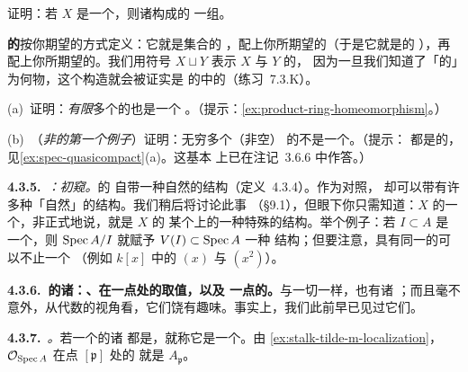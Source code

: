 \begin{exercise}[容易的练习]\label{ex:affine-opens-base}
证明：若 $X$ 是一个\trScheme，则诸\trAffine\trOpenSet{}构成\trZariskiTopology{}的
一组\trBase。
\end{exercise}

\begin{exercise}[容易的练习]\label{ex:disjoint-union-schemes}
\textbf{\trScheme{}的\trDisjointUnion}按你期望的方式定义：它就是集合的%
\trDisjointUnion，配上你所期望的\trTopology（于是它就是\trTopologicalSpace{}的%
\trDisjointUnion），再配上你所期望的\trSheaf。我们用符号 $X\sqcup Y$ 表示 $X$ 与
$Y$ 的\trDisjointUnion，
因为一旦我们知道了「\trScheme{}的\trMorphism」为何物，这个构造就会被证实是\trScheme{}
的\trCategory{}中的\trCoproduct（\mbox{练习~7.3.K}）。

(a)~证明：\emph{有限}多个\trAffineScheme{}的\trDisjointUnion{}也是一个%
\trAffineScheme。（提示：\cref{ex:product-ring-homeomorphism}。）

(b)~（\emph{非\trAffineScheme{}的第一个例子}）证明：无穷多个（非空）%
\trAffineScheme{}的\trDisjointUnion{}不是一个\trAffineScheme。（提示：%
\trAffineScheme{}都是\trQuasicompact{}的，见\cref{ex:spec-quasicompact}(a)。这基本
上已在注记~3.6.6 中作答。）
\end{exercise}

\textbf{4.3.5.}\ \emph{\trhRemark{}：初窥\trClosedSubscheme{}。}\quad \trScheme{}的%
\trOpenSubset{}自带一种自然的\trScheme{}结构（定义~4.3.4）。作为对照，%
\trClosedSubset{}却可以带有许多种「自然」的\trScheme{}结构。我们稍后将讨论此事
（\S9.1），但眼下你只需知道：$X$ 的一个\trClosedSubscheme，非正式地说，就是 $X$ 的
某个\trClosedSubset{}上的一种特殊的\trScheme{}结构。举个例子：若 $I\subset A$ 是
一个\trIdeal，则 $\operatorname{Spec} A/I$ 就赋予\trClosedSubset{} $V(I)\subset\operatorname{Spec} A$ 一种%
\trScheme{}结构；但要注意，具有同一\trVanishingSet{}的\trIdeal{}可以不止一个
（例如 $k[x]$ 中的 $(x)$ 与 $(x^2)$）。

\textbf{4.3.6.\ \trStructureSheaf{}的诸\trStalk{}：\trGerm{}、在一点处的取值，以及
一点的\trResidueField{}。}\quad 与一切\trSheaf{}一样，\trStructureSheaf{}也有诸%
\trStalk；而且毫不意外，从代数的视角看，它们饶有趣味。事实上，我们此前早已见过它们。

\textbf{4.3.7.}\ \emph{\trhDefinition{}。}\quad 若一个\trRingedSpace{}的诸\trStalk{}
都是\trLocalRing，就称它是一个\textbf{\trLocallyRingedSpace{}}。由%
\cref{ex:stalk-tilde-m-localization}，$\mathcal{O}_{\operatorname{Spec} A}$ 在点 $[\mathfrak{p}]$ 处的%
\trStalk{}就是\trLocalRing{} $A_{\mathfrak{p}}$。

